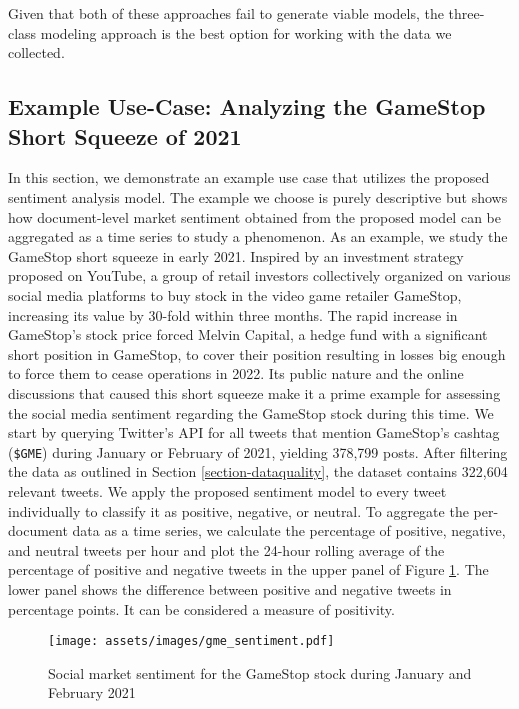 

Given that both of these approaches fail to generate viable models, the three-class modeling approach is the best option for working with the data we collected.

\subsection{Example Use-Case: Analyzing the GameStop Short Squeeze of 2021}
In this section, we demonstrate an example use case that utilizes the proposed sentiment analysis model. The example we choose is purely descriptive but shows how document-level market sentiment obtained from the proposed model can be aggregated as a time series to study a phenomenon.
As an example, we study the GameStop short squeeze in early 2021. Inspired by an investment strategy proposed on YouTube, a group of retail investors collectively organized on various social media platforms to buy stock in the video game retailer GameStop, increasing its value by 30-fold within three months. The rapid increase in GameStop's stock price forced Melvin Capital, a hedge fund with a significant short position in GameStop, to cover their position resulting in losses big enough to force them to cease operations in 2022. Its public nature and the online discussions that caused this short squeeze make it a prime example for assessing the social media sentiment regarding the GameStop stock during this time.\newline
We start by querying Twitter's API for all tweets that mention GameStop's cashtag (\texttt{\$GME}) during January or February of 2021, yielding 378,799 posts. After filtering the data as outlined in Section \ref{section-dataquality}, the dataset contains 322,604 relevant tweets. We apply the proposed sentiment model to every tweet individually to classify it as positive, negative, or neutral. To aggregate the per-document data as a time series, we calculate the percentage of positive, negative, and neutral tweets per hour and plot the 24-hour rolling average of the percentage of positive and negative tweets in the upper panel of Figure \ref{figure-gme-sentiment}. The lower panel shows the difference between positive and negative tweets in percentage points. It can be considered a measure of positivity.

\begin{figure}[!ht]
	\texttt{[image: assets/images/gme\_sentiment.pdf]}
	\caption{Social market sentiment for the GameStop stock during January and February 2021}
	\label{figure-gme-sentiment}
\end{figure}

